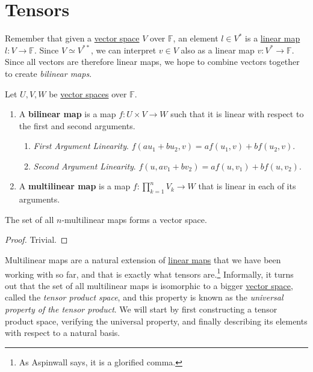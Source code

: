\section{Tensors}

	Remember that given a \hyperref[def:vector-space]{vector space} $V$ over $\mathbb{F}$, an element $l \in V^\ast$ is a \hyperref[def:linear_map]{linear map} $l: V \to \mathbb{F}$. Since $V \simeq V^{\ast\ast}$, we can interpret $v \in V$ also as a linear map $v: V^\ast \to \mathbb{F}$. Since all vectors are therefore linear maps, we hope to combine vectors together to create \textit{bilinear maps}. 

	\begin{definition}
	  \label{def:bilinear-map}
		Let $U, V, W$ be \hyperref[def:vector-space]{vector spaces} over $\mathbb{F}$. 
		\begin{enumerate}
		  \item A \textbf{bilinear map} is a map $f: U \times V \to W$ such that it is linear with respect to the first and second arguments. 
				\begin{enumerate}
					\item \textit{First Argument Linearity}. $f(a u_1 + b u_2, v) = a f(u_1, v) + b f(u_2, v)$. 
					\item \textit{Second Argument Linearity}. $f(u, a v_1 + b v_2) = a f(u, v_1) + b f(u, v_2)$. 
				\end{enumerate}
			\item A \textbf{multilinear map} is a map $f: \prod_{k=1}^n V_k \to W$ that is linear in each of its arguments.  
		\end{enumerate}
		The set of all $n$-multilinear maps forms a vector space. 
	\end{definition}
	\begin{proof}
	  Trivial. 
	\end{proof}

	Multilinear maps are a natural extension of \hyperref[def:linear_map]{linear maps} that we have been working with so far, and that is exactly what tensors are.\footnote{As Aspinwall says, it is a glorified comma.} Informally, it turns out that the set of all multilinear maps is isomorphic to a bigger \hyperref[def:vector-space]{vector space}, called the \textit{tensor product space}, and this property is known as the \textit{universal property of the tensor product}. We will start by first constructing a tensor product space, verifying the universal property, and finally describing its elements with respect to a natural basis. 

